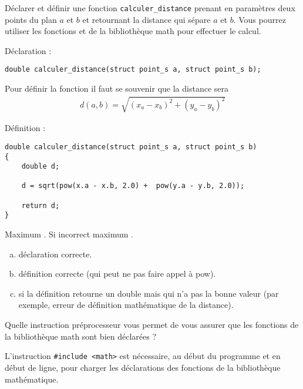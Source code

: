 \question Déclarer et définir une fonction \verb+calculer_distance+
prenant en paramètres deux points du plan $a$ et $b$ et retournant la
distance qui sépare $a$ et $b$. Vous pourrez utiliser les fonctions
 et   de la
bibliothèque math pour effectuer le calcul. 

\begin{correction}
Déclaration :
\begin{small}
\begin{verbatim}
double calculer_distance(struct point_s a, struct point_s b);
\end{verbatim}
\end{small}  

Pour définir la fonction il faut se souvenir que la distance sera 
\begin{gather*}
  d(a, b) = \sqrt{(x_a - x_b)^2+(y_a - y_b)^2}
\end{gather*}

Définition :
\begin{small}
\begin{verbatim}
double calculer_distance(struct point_s a, struct point_s b)
{
    double d;

    d = sqrt(pow(x.a - x.b, 2.0) +  pow(y.a - y.b, 2.0));

    return d;
}
\end{verbatim}
\end{small}  
\end{correction}

\begin{baremeenv}
Maximum . Si incorrect maximum .
  \begin{enumerate}[(a)]
  \item {} déclaration correcte.
  \item {} définition correcte (qui peut ne pas faire appel à pow).
\item {} si la définition retourne un double mais qui n'a pas
  la bonne valeur (par exemple, erreur de définition mathématique de la distance).
 \end{enumerate}
\end{baremeenv}

\question Quelle instruction préprocesseur vous permet de vous assurer
que les fonctions de la bibliothèque math sont bien déclarées ?

\begin{correction}
  L'instruction \verb+#include <math>+ est nécessaire, au début du
  programme et en début de
  ligne, pour charger les déclarations des fonctions de la bibliothèque
  mathématique.
\end{correction}

